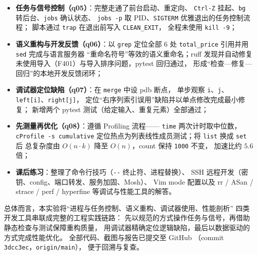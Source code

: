 \documentclass[a4paper,11pt]{ctexart}
\begin{document}
\begin{itemize}
  \item \textbf{任务与信号控制（q05）}：完整走通了前台启动、重定向、
        \texttt{Ctrl-Z} 挂起、\texttt{bg} 转后台、\texttt{jobs} 确认状态、
        \texttt{jobs -p} 取 PID、\texttt{SIGTERM} 优雅退出的任务控制流程；
        脚本通过 \texttt{trap} 在退出前写入 \texttt{CLEAN\_EXIT}，
        全程未使用 \texttt{kill -9}；
  \item \textbf{语义重构与开发反馈（q06）}：以 \texttt{grep} 定位全部 6 处
        \texttt{total\_price} 引用并用 \texttt{sed} 完成与语言服务器
        ``重命名符号''等效的语义重命名；ruff 发现并自动修复
        未使用导入（F401）与导入排序问题，pytest 回归通过，
        形成``检查—修复—回归''的本地开发反馈闭环；
  \item \textbf{调试器定位缺陷（q07）}：在 \texttt{merge} 中设 pdb 断点，
        单步观察 \texttt{i}、\texttt{j}、\texttt{left[i]}、\texttt{right[j]}，
        定位``右序列索引误用''缺陷并以单点修改完成最小修复；
        新增两个 pytest 测试（给定输入、重复元素）全部通过；
  \item \textbf{先测量再优化（q08）}：遵循 Profiling 流程——
        \texttt{time} 两次计时取中位数，\texttt{cProfile -s cumulative}
        定位热点为列表线性成员测试；将 \texttt{list} 换成 \texttt{set} 后
        总复杂度由 $O(n \cdot k)$ 降至 $O(n)$，count 保持 \texttt{1000} 不变，
        加速比约 $5.6$ 倍；
  \item \textbf{课后练习}：整理了命令行技巧（\texttt{-{}-} 终止符、进程替换）、
        SSH 远程开发（密钥、config、端口转发、服务加固、Mosh）、
        Vim mode 配置以及 rr / ASan / strace / perf / hyperfine
        等调试与性能工具的解答。
\end{itemize}

总体而言，本实验将``进程与任务控制、语义重构、调试器使用、性能剖析''
四类开发工具串联成完整的工程实践链路：
先以规范的方式操作任务与信号，再借助静态检查与测试保障重构质量，
用调试器精确定位逻辑缺陷，最后以数据驱动的方式完成性能优化。
全部代码、截图与报告已提交至 GitHub
（commit \texttt{3dcc3ec}，\texttt{origin/main}），
便于回溯与复查。
\end{document}
